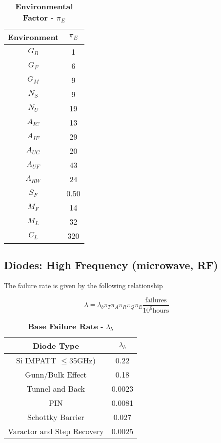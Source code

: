 \begin{table}[h]
\caption{
\textbf{Environmental Factor -} $\pi_{E}$}
\label{table:enviroFactorDiode}
\begin{tabular}{|c|c|} \hline
\rowcolor{Gray}
\textbf{Environment} & $\pi_{E}$ \\ \hline
$G_{B}$ & 1 \\ \hline
$G_{F}$ & 6 \\ \hline
$G_{M}$ & 9 \\ \hline
$N_{S}$ & 9 \\ \hline
$N_{U}$ & 19 \\ \hline
$A_{IC}$ & 13 \\ \hline
$A_{IF}$ & 29 \\ \hline
$A_{UC}$ & 20 \\ \hline
$A_{UF}$ & 43 \\ \hline
$A_{RW}$ & 24 \\ \hline
$S_{F}$ & 0.50 \\ \hline
$M_{F}$ & 14 \\ \hline
$M_{L}$ & 32 \\ \hline
$C_{L}$ & 320 \\ \hline
\end{tabular}
\end{table}

\newpage

\subsection{Diodes: High Frequency (microwave, RF)}
\label{subsection:diodes-high-frequency-microwave-rf}

The failure rate is given by the following relationship

$$\lambda = \lambda_{b} \pi_{T} \pi_{A} \pi_{R} \pi_{Q} \pi_{E} \frac{\text{failures}}{10^{6} \text{hours}}$$


\begin{table}[h]
\caption{\textbf{Base Failure Rate} - $\lambda_{b}$}
\label{table:baseFailureRateDiodeHigh}
\begin{tabular}{|c|c|} \hline
\rowcolor{Gray}
\textbf{Diode Type} & $\lambda_{b}$ \\ \hline
Si IMPATT $\leq 35$GHz) & 0.22 \\ \hline
Gunn/Bulk Effect & 0.18 \\ \hline
Tunnel and Back & 0.0023 \\ \hline
PIN & 0.0081 \\ \hline
Schottky Barrier & 0.027 \\ \hline
Varactor and Step Recovery & 0.0025 \\ \hline
\end{tabular}
\end{table}


